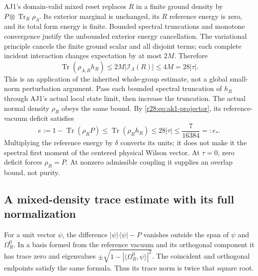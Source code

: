 AJ1's domain-valid mixed reset replaces $R$ in a finite ground density by $P\otimes\operatorname{Tr}_R\rho_\Lambda$. Its exterior marginal is unchanged, its $R$ reference energy is zero, and its total form energy is finite. Bounded spectral truncations and monotone convergence justify the unbounded exterior energy cancellation. The variational principle cancels the finite ground scalar and all disjoint terms; each complete incident interaction changes expectation by at most $2M$. Therefore
\begin{equation}
 \operatorname{Tr}(\rho_{\Lambda,R}h_R)
 \le2M|\mathcal I_\Lambda(R)|\le4M=28|\tau|.
 \label{r28:eq:ak1-reset}
\end{equation}
This is an application of the inherited whole-group estimate, not a global small-norm perturbation argument. Pass each bounded spectral truncation of $h_R$ through AJ1's actual local state limit, then increase the truncation. The actual normal density $\rho_R$ obeys the same bound. By \eqref{r28:eq:ak1-projector}, its reference-vacuum deficit satisfies
\begin{equation}
 e:=1-\operatorname{Tr}(\rho_RP)
 \le\operatorname{Tr}(\rho_Rh_R)\le28|\tau|
 \le\frac7{16384}=:e_*.
 \label{r28:eq:ak1-deficit}
\end{equation}
Multiplying the reference energy by $\delta$ converts its units; it does not make it the spectral first moment of the centered physical Wilson vector. At $\tau=0$, zero deficit forces $\rho_R=P$. At nonzero admissible coupling it supplies an overlap bound, not purity.

\subsection{A mixed-density trace estimate with its full normalization}
For a unit vector $\psi$, the difference $|\psi\rangle\langle\psi|-P$ vanishes outside the span of $\psi$ and $\Omega_R^0$. In a basis formed from the reference vacuum and its orthogonal component it has trace zero and eigenvalues $\pm\sqrt{1-|\langle\Omega_R^0,\psi\rangle|^2}$. The coincident and orthogonal endpoints satisfy the same formula. Thus its trace norm is twice that square root.

